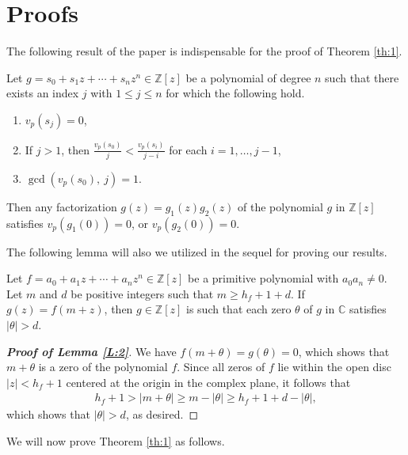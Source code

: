 \documentclass[12pt]{amsart}%
\begin{document}
\section{Proofs}
The following result of the paper \cite[Lemma 9]{Singh25} is indispensable for the proof of Theorem \ref{th:1}.
\begin{lemmax}\label{L:1}
Let $g=s_0 + s_1z + \cdots + s_nz^n \in \mathbb{Z}[z]$ be a polynomial of degree $n$ such that there exists an index  $j$ with $1\leq j\leq n$ for which the following hold.
\begin{enumerate}[label=$(\roman*)$]
\item $v_p(s_j)=0$,
\item If $j>1$, then $\frac{v_p(s_0)}{j}<\frac{v_p(s_i)}{j-i}$ for each $i=1,\ldots, j-1$,
\item $\gcd(v_p(s_0),~j) = 1$.
\end{enumerate}
Then any factorization $g(z)=g_1(z)g_2(z)$ of the polynomial $g$ in $\mathbb{Z}[z]$ satisfies $v_p(g_1(0))=0$, or $v_p(g_2(0))=0$.
\end{lemmax}
The following lemma will also we utilized in the sequel for proving our results.
\begin{lemma}\label{L:2}
Let $f=a_0+a_1z+\cdots+a_nz^n\in \mathbb{Z}[z]$ be a primitive polynomial with $a_0a_n\neq 0$. Let $m$ and $d$ be positive integers such that $m\geq h_f+1+d$. If $g(z)=f(m+z)$, then $g\in \mathbb{Z}[z]$ is such that each zero $\theta$ of $g$ in $\mathbb{C}$ satisfies $|\theta|>d$.
\end{lemma}
\begin{proof}[\bf Proof of Lemma \ref{L:2}]
We have $f(m+\theta)=g(\theta)=0$, which shows that $m+\theta$ is a zero of the polynomial $f$. Since all zeros of $f$ lie within the open disc $|z|<h_f+1$ centered at the origin in the complex plane, it follows that
\begin{eqnarray*}
h_f+1>|m+\theta|\geq m-|\theta|\geq h_f+1+d-|\theta|,
\end{eqnarray*}
which shows that $|\theta|>d$, as desired.
\end{proof}
We will now prove Theorem \ref{th:1} as follows.
\end{document}
